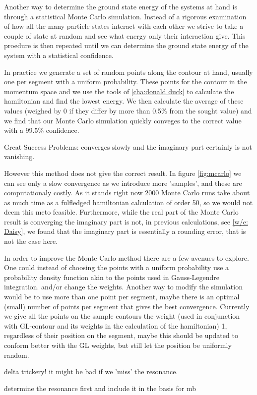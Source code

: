 Another way to determine the ground state energy of the systems at hand is through a statistical Monte Carlo simulation. 
Instead of a rigorous examination of how all the many particle states interact with each other we strive to take a couple of state at random and see what energy only their interaction give. 
This proedure is then repeated until we can determine the ground state energy of the system with a statistical confidence.

In practice we generate a set of random points along the contour at hand, usually one per segment with a uniform probability. 
These points for the contour in the momentum space and we use the tools of \cref{cha:donald duck} to calculate the hamiltonian and find the lowest energy. 
We then calculate the average of these values (weighed by 0 if they differ by more than 0.5\% from the sought value) and we find that our Monte Carlo simulation quickly conveges to the correct value with a 99.5\% confidence.

Great Success
Problems: converges slowly and the imaginary part certainly is not vanishing.



However this method does not give the correct result. 
In figure \cref{fig:mcarlo} we can see only a slow convergence as we introduce more 'samples', and these are computationaly costly. 
As it stands right now 2000 Monte Carlo runs take about as much time as a fulfledged hamiltonian calculation of order 50, so we would not deem this meto feasible.
Furthermore, while the real part of the Monte Carlo result is converging the imaginary part is not, in previous calculations, see \cref{w/e: Daisy}, we found that the imaginary part is essentially a rounding error, that is not the case here.

In order to improve the Monte Carlo method there are a few avenues to explore.
One could instead of choosing the points with a uniform probability use a probability density function akin to the points used in Gauss-Legendre integration. 
and/or change the weights.
Another way to modify the simulation would be to use more than one point per segment, maybe there is an optimal (small) number of points per segment that gives the best convergence. 
Currently we give all the points on the sample contours the weight (used in conjunction with GL-contour and its weights in the calculation of the hamiltonian) 1, regardless of their position on the segment, maybe this should be updated to conform better with the GL weights, but still let the position be uniformly random.

delta trickery! it might be bad if we 'miss' the resonance.

determine the resonance first and include it in the basis for mb